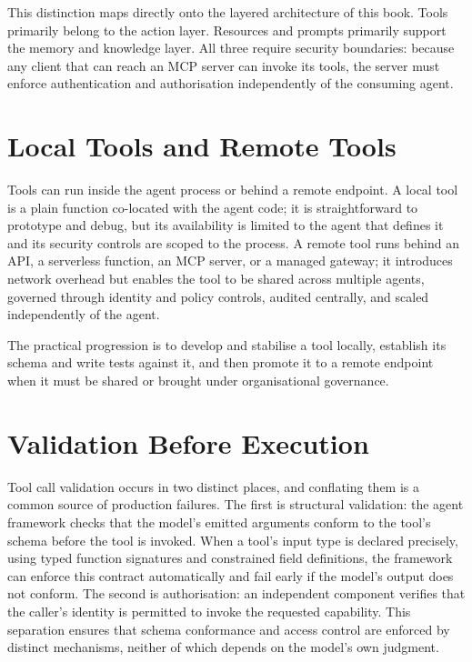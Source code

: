 This distinction maps directly onto the layered architecture of this book. Tools primarily
belong to the action layer. Resources and prompts primarily support the memory and
knowledge layer. All three require security boundaries: because any client that can reach
an MCP server can invoke its tools, the server must enforce authentication and
authorisation independently of the consuming agent.

\section{Local Tools and Remote Tools}

Tools can run inside the agent process or behind a remote endpoint. A local tool is a
plain function co-located with the agent code; it is straightforward to prototype and
debug, but its availability is limited to the agent that defines it and its security
controls are scoped to the process. A remote tool runs behind an API, a serverless
function, an MCP server, or a managed gateway; it introduces network overhead but enables
the tool to be shared across multiple agents, governed through identity and policy
controls, audited centrally, and scaled independently of the agent.

The practical progression is to develop and stabilise a tool locally, establish its
schema and write tests against it, and then promote it to a remote endpoint when it must
be shared or brought under organisational governance.

\section{Validation Before Execution}

Tool call validation occurs in two distinct places, and conflating them is a common
source of production failures. The first is structural validation: the agent framework
checks that the model's emitted arguments conform to the tool's schema before the tool
is invoked. When a tool's input type is declared precisely, using typed function
signatures and constrained field definitions, the framework can enforce this contract
automatically and fail early if the model's output does not conform. The second is
authorisation: an independent component verifies that the caller's identity is permitted
to invoke the requested capability. This separation ensures that schema conformance and
access control are enforced by distinct mechanisms, neither of which depends on the
model's own judgment.

